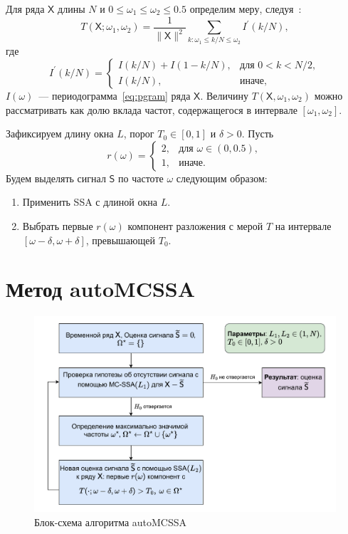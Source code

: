 \documentclass[specialist,
substylefile = spbu_report.rtx,
subf,href,colorlinks=true, 12pt]{disser}
\theoremstyle{definition}
\begin{document}
Для ряда $\mathsf{X}$ длины $N$ и $0\leqslant\omega_1\leqslant\omega_2\leqslant0.5$ определим меру, следуя~\cite{Alexandrov2009}:
\begin{equation}\label{eq:freq_measure}
	T(\mathsf{X};\omega_1,\omega_2)=\frac{1}{\|\mathsf{X}\|^2}\sum_{k:\omega_1\leqslant k/N\leqslant \omega_2}I^\prime(k/N),
\end{equation}
где \
\[
	I^\prime(k / N)=
	\begin{cases}
		I(k / N) + I(1 - k / N), & \text{для } 0<k<N/2, \\
		I(k / N),                & \text{иначе},
	\end{cases}
\]
$I(\omega)$~--- периодограмма~\eqref{eq:pgram} ряда $\mathsf{X}$. Величину $T(\mathsf{X},\omega_1,\omega_2)$ можно рассматривать как долю вклада частот, содержащегося в интервале $[\omega_1,\omega_2]$.

Зафиксируем длину окна $L$, порог $T_0\in[0, 1]$ и $\delta>0$. Пусть
\[
	r(\omega)=
	\begin{cases}
		2, & \text{для } \omega\in(0, 0.5), \\
		1, & \text{иначе}.
	\end{cases}
\]
Будем выделять сигнал $\mathsf{S}$ по частоте $\omega$ следующим образом:
\begin{enumerate}
	\item Применить SSA с длиной окна $L$.
	\item Выбрать первые $r(\omega)$ компонент разложения с мерой $T$ на интервале $[\omega-\delta, \omega+\delta]$, превышающей $T_0$.
\end{enumerate}

\section{Метод autoMCSSA}\label{sect:autoMCSSA}

\begin{figure}[htbp]
	\centering
	\includegraphics[width=\textwidth]{img/auto_mcssa_alg.pdf}
	\caption{Блок-схема алгоритма autoMCSSA}
	\label{fig:autoMCSSA_alg}
\end{figure}
\end{document}
